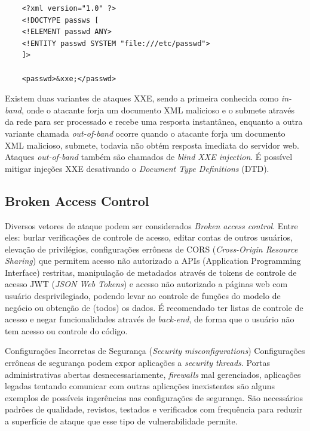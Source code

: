 \begin{verbatim}
    <?xml version="1.0" ?>
    <!DOCTYPE passws [
    <!ELEMENT passwd ANY>
    <!ENTITY passwd SYSTEM "file:///etc/passwd">
    ]>

    <passwd>&xxe;</passwd>
\end{verbatim}

Existem duas variantes de ataques XXE, sendo a primeira conhecida como \textit{in-band}, onde o atacante forja um documento XML malicioso e o submete através da rede para ser processado e recebe uma resposta instantânea, enquanto a outra variante chamada \textit{out-of-band} ocorre quando o atacante forja um documento XML malicioso, submete, todavia não obtém resposta imediata do servidor web. Ataques \textit{out-of-band} também são chamados de \textit{blind XXE injection}.
É possível mitigar injeções XXE desativando o \textit{Document Type Definitions} (DTD). 

\subsection{Broken Access Control}
Diversos vetores de ataque podem ser considerados \textit{Broken access control}. Entre eles: burlar verificações de controle de acesso, editar contas de outros usuários, elevação de privilégios, configurações errôneas de CORS (\textit{Cross-Origin Resource Sharing}) que permitem acesso não autorizado a APIs (Application Programming Interface) restritas, manipulação de metadados através de tokens de controle de acesso JWT (\textit{JSON Web Tokens}) e acesso não autorizado a páginas web com usuário desprivilegiado, podendo levar ao controle de funções do modelo de negócio ou obtenção de (todos) os dados.
É recomendado ter listas de controle de acesso e negar funcionalidades através de \textit{back-end}, de forma que o usuário não tem acesso ou controle do código.

Configurações Incorretas de Segurança (\textit{Security misconfigurations})
Configurações errôneas de segurança podem expor aplicações a \textit{security threads}. Portas administrativas abertas desnecessariamente, \textit{firewalls} mal gerenciados, aplicações legadas tentando comunicar com outras aplicações inexistentes são alguns exemplos de possíveis ingerências nas configurações de segurança. São necessários padrões de qualidade, revistos, testados e verificados com frequência para reduzir a superfície de ataque que esse tipo de vulnerabilidade permite.

